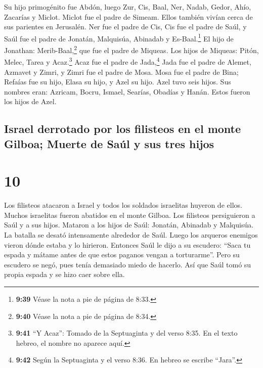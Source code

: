  Su hijo primogénito fue Abdón, luego Zur, Cis, Baal,
Ner, Nadab,  Gedor, Ahío, Zacarías y Miclot.
 Miclot fue el padre de Simeam. Ellos también vivían
cerca de sus parientes en Jerusalén.  Ner fue el padre de
Cis, Cis fue el padre de Saúl, y Saúl fue el padre de Jonatán,
Malquisúa, Abinadab y Es-Baal.\footnote{\textbf{9:39} Véase la nota a
  pie de página de 8:33.}  El hijo de Jonathan:
Merib-Baal,\footnote{\textbf{9:40} Véase la nota a pie de página de
  8:34.} que fue el padre de Miqueas.  Los hijos de
Miqueas: Pitón, Melec, Tarea y Acaz.\footnote{\textbf{9:41} ``Y Acaz'':
  Tomado de la Septuaginta y del verso 8:35. En el texto hebreo, el
  nombre no aparece aquí.}  Acaz fue el padre de
Jada,\footnote{\textbf{9:42} Según la Septuaginta y el verso 8:36. En
  hebreo se escribe ``Jara''.} Jada fue el padre de Alemet, Azmavet y
Zimri, y Zimri fue el padre de Mosa.  Mosa fue el padre
de Bina; Refaías fue su hijo, Elasa su hijo, y Azel su hijo.
 Azel tuvo seis hijos. Sus nombres eran: Azricam, Bocru,
Ismael, Searías, Obadías y Hanán. Estos fueron los hijos de Azel.

\hypertarget{israel-derrotado-por-los-filisteos-en-el-monte-gilboa-muerte-de-sauxfal-y-sus-tres-hijos}{%
\subsection{Israel derrotado por los filisteos en el monte Gilboa;
Muerte de Saúl y sus tres
hijos}\label{israel-derrotado-por-los-filisteos-en-el-monte-gilboa-muerte-de-sauxfal-y-sus-tres-hijos}}

\hypertarget{section-9}{%
\section{10}\label{section-9}}

 Los filisteos atacaron a Israel y todos los soldados
israelitas huyeron de ellos. Muchos israelitas fueron abatidos en el
monte Gilboa.  Los filisteos persiguieron a Saúl y a sus
hijos. Mataron a los hijos de Saúl: Jonatán, Abinadab y Malquisúa.
 La batalla se desató intensamente alrededor de Saúl.
Luego los arqueros enemigos vieron dónde estaba y lo hirieron.
 Entonces Saúl le dijo a su escudero: ``Saca tu espada y
mátame antes de que estos paganos vengan a torturarme''. Pero su
escudero se negó, pues tenía demasiado miedo de hacerlo. Así que Saúl
tomó su propia espada y se hizo caer sobre ella.

